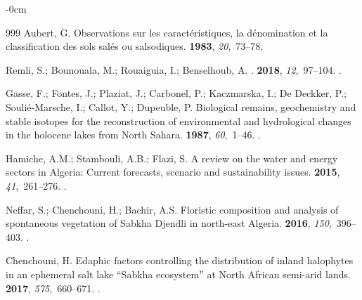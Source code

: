 \documentclass[asi,article,accept,pdftex,moreauthors]{Definitions/mdpi}
\begin{document}
\begin{adjustwidth}{-\extralength}{0cm}
\begin{thebibliography}{999}
Aubert, G.
\newblock Observations sur les caract{\'e}ristiques, la d{\'e}nomination et la
  classification des sols sal{\'e}s ou salsodiques.
 {\bf 1983}, {\em 20},~73--78.

Remli, S.; Bounouala, M.; Rouaiguia, I.; Benselhoub, A.
.
 {\bf 2018}, {\em 12},~97--104.
.

Gasse, F.; Fontes, J.; Plaziat, J.; Carbonel, P.; Kaczmarska, I.; {De Deckker},
  P.; Soulié-Marsche, I.; Callot, Y.; Dupeuble, P.
\newblock Biological remains, geochemistry and stable isotopes for the
  reconstruction of environmental and hydrological changes in the holocene
  lakes from North Sahara.
 {\bf 1987},
  {\em 60},~1--46.
.

Hamiche, A.M.; Stambouli, A.B.; Flazi, S.
\newblock A review on the water and energy sectors in Algeria: Current
  forecasts, scenario and sustainability issues.
 {\bf 2015}, {\em
  41},~261--276.
.

Neffar, S.; Chenchouni, H.; Bachir, A.S.
\newblock Floristic composition and analysis of spontaneous vegetation of
  Sabkha Djendli in north-east Algeria.
 {\bf 2016}, {\em 150},~396--403.
.

Chenchouni, H.
\newblock Edaphic factors controlling the distribution of inland halophytes in
  an ephemeral salt lake “Sabkha ecosystem” at North African semi-arid
  lands.
 {\bf 2017}, {\em
  575},~660--671.
.


\end{thebibliography}
\end{adjustwidth}
\end{document}
